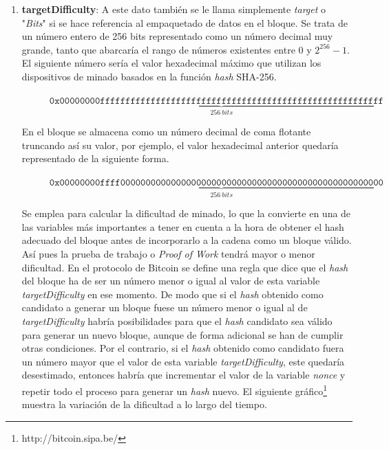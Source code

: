\documentclass{article}
\begin{document}
\begin{enumerate}
\begin{verbatim}
    printf("Timestamp epoch: %ld\n", (long) tod);
}
        \end{verbatim}
        
    
        \item \textbf{targetDifficulty}: A este dato también se le llama simplemente \textit{target} o "\textit{Bits}" si se hace referencia al empaquetado de datos en el bloque. Se trata de un número entero de 256 bits representado como un número decimal muy grande, tanto que abarcaría el rango de números existentes entre $0$ y $2^{256}-1$. El siguiente número sería el valor hexadecimal máximo que utilizan los dispositivos de minado basados en la función \textit{hash} SHA-256.
        
            \begin{figure}[H]
                \centering
                \scriptsize{
                $\texttt{0x}\underbrace{\texttt{00000000ffffffffffffffffffffffffffffffffffffffffffffffffffffffff}}_{256\ bits}$
                }
            \end{figure}
        
        En el bloque se almacena como un número decimal de coma flotante truncando así su valor, por ejemplo, el valor hexadecimal anterior quedaría representado de la siguiente forma.
        
            \begin{figure}[H]
                \centering
                \scriptsize{
                $\texttt{0x}\underbrace{\texttt{00000000ffff0000000000000000000000000000000000000000000000000000}}_{256\ bits}$
                }
            \end{figure}
        
        Se emplea para calcular la dificultad de minado, lo que la convierte en una de las variables más importantes a tener en cuenta a la hora de obtener el hash adecuado del bloque antes de incorporarlo a la cadena como un bloque válido. Así pues la prueba de trabajo o \textit{Proof of Work} tendrá mayor o menor dificultad. En el protocolo de Bitcoin se define una regla que dice que el \textit{hash} del bloque ha de ser un número menor o igual al valor de esta variable \textit{targetDifficulty} en ese momento. De modo que si el \textit{hash} obtenido como candidato a generar un bloque fuese un número menor o igual al de \textit{targetDifficulty} habría posibilidades para que el \textit{hash} candidato sea válido para generar un nuevo bloque, aunque de forma adicional se han de cumplir otras condiciones. Por el contrario, si el \textit{hash} obtenido como candidato fuera un número mayor que el valor de esta variable \textit{targetDifficulty}, este quedaría desestimado, entonces habría que incrementar el valor de la variable \textit{nonce} y repetir todo el proceso para generar un \textit{hash} nuevo. El siguiente gráfico\footnote{http://bitcoin.sipa.be/} muestra la variación de la dificultad a lo largo del tiempo.
        

\end{enumerate}
\end{document}
